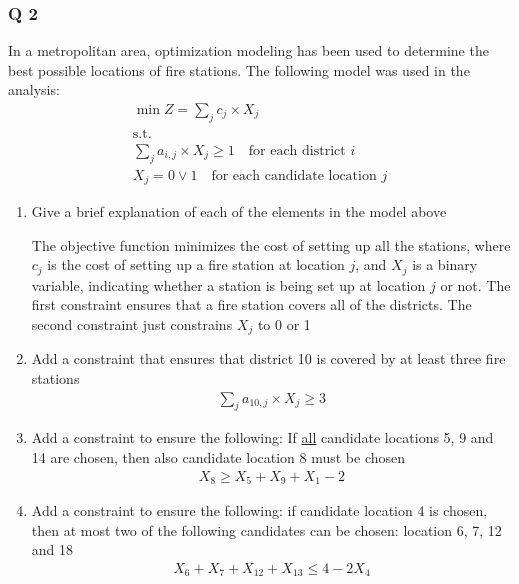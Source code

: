 \documentclass[10pt]{article}
\begin{document}
\subsubsection{Q 2}
In a metropolitan area, optimization modeling has been used to determine the best possible locations of fire stations. The following model was used in the analysis: 
\begin{gather*}
    \min Z = \sum_j c_j \times X_j\\
    \text{s.t.}\\ 
    \sum_j a_{i, j}\times X_j\ge 1 \quad\text{for each district }i\\ 
    X_j = 0\lor 1\quad\text{for each candidate location }j
\end{gather*}
\begin{enumerate}
    \item Give a brief explanation of each of the elements in the model above 

    The objective function minimizes the cost of setting up all the stations, where $c_j $ is the cost of setting up a fire station at location $j $, and $X_j $ is a binary variable, indicating whether a station is being set up at location $j $ or not. The first constraint ensures that a fire station covers all of the districts. The second constraint just constrains $X_j $ to 0 or 1 
    \item Add a constraint that ensures that district 10 is covered by at least three fire stations 
    \begin{gather*}
        \sum_j a_{10, j}\times X_j\ge 3
    \end{gather*}
    \item Add a constraint to ensure the following: If \underline{all} candidate locations 5, 9 and 14 are chosen, then also candidate location 8 must be chosen
    \begin{gather*}
        X_8\ge X_5 + X_9 + X_1 - 2
    \end{gather*}
    \item Add a constraint to ensure the following: if candidate location 4 is chosen, then at most two of the following candidates can be chosen: location 6, 7, 12 and 18
    \begin{gather*}
        X_6 + X_7 + X_12 + X_13 \le 4 - 2X_4
    \end{gather*}
\end{enumerate}
\newpage 
\end{document}
